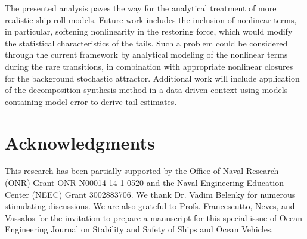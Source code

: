 \documentclass[3p]{elsarticle}
\begin{document}
The presented analysis   paves the way for the analytical treatment of more realistic ship roll models.  Future work  includes the inclusion of nonlinear terms, in particular, softening nonlinearity in the restoring force, which would modify  the   statistical characteristics of the tails. Such a problem could   be considered through the current framework by analytical modeling of the nonlinear terms during the rare transitions, in combination with appropriate nonlinear closures for the background stochastic attractor. Additional work will include application of the decomposition-synthesis method in a data-driven context using models containing model error to derive tail estimates.



\section*{Acknowledgments}
This research has been partially supported  by the Office of Naval Research (ONR) Grant ONR N00014-14-1-0520 and the Naval Engineering Education
Center (NEEC) Grant 3002883706. We thank  Dr. Vadim Belenky for numerous stimulating discussions. We are also  grateful to Profs. Francescutto, Neves, and Vassalos for the invitation  to prepare a manuscript for this special issue of Ocean Engineering Journal on Stability and Safety of Ships and Ocean Vehicles.

\clearpage

\end{document}
